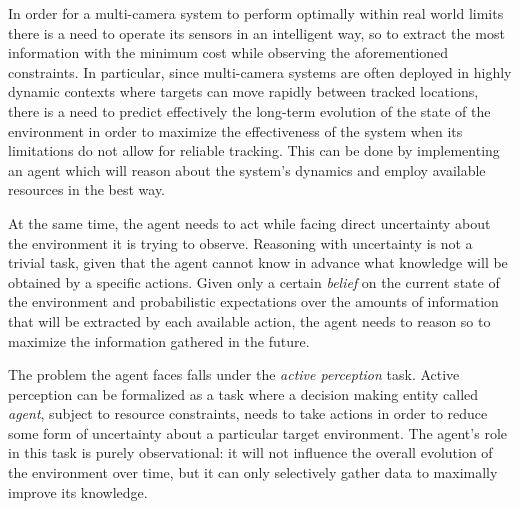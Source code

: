 
In order for a multi-camera system to perform optimally within real world limits there is a need to
operate its sensors in an intelligent way, so to extract the most information with the minimum cost
while observing the aforementioned constraints. In particular, since multi-camera systems are often
deployed in highly dynamic contexts where targets can move rapidly between tracked locations, there
is a need to predict effectively the long-term evolution of the state of the environment in order to
maximize the effectiveness of the system when its limitations do not allow for reliable tracking.
This can be done by implementing an agent which will reason about the system's dynamics and employ
available resources in the best way.

At the same time, the agent needs to act while facing direct uncertainty about the environment it is
trying to observe. Reasoning with uncertainty is not a trivial task, given that the agent cannot
know in advance what knowledge will be obtained by a specific actions. Given only a certain
\textit{belief} on the current state of the environment and probabilistic expectations over the
amounts of information that will be extracted by each available action, the agent needs to reason so
to maximize the information gathered in the future.


The problem the agent faces falls under the \textit{active perception} \cite{cit:relworkspaan}
\cite{cit:relworkspaancoop} \cite{cit:relworksatsangi} task.  Active perception can be formalized as
a task where a decision making entity called \textit{agent}, subject to resource constraints, needs
to take actions in order to reduce some form of uncertainty about a particular target environment.
The agent's role in this task is purely observational: it will not influence the overall evolution
of the environment over time, but it can only selectively gather data to maximally improve its
knowledge.

